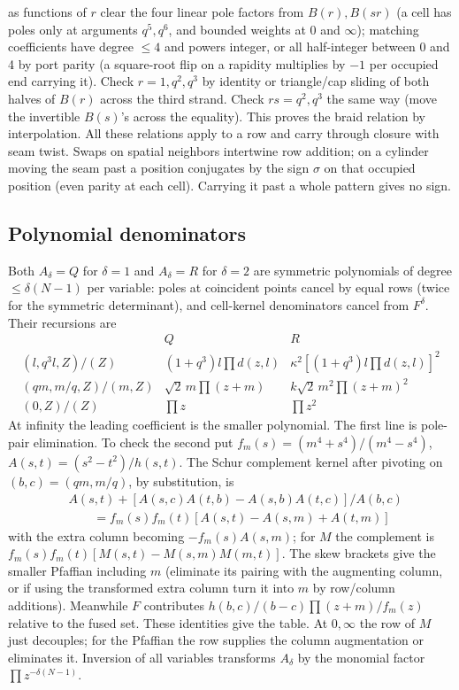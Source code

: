 as functions of \(r\) clear the four linear pole factors from \(B(r),B(sr)\) (a cell has poles only at arguments \(q^5,q^6\), and bounded weights at 0 and \(\infty\)); matching coefficients have degree \(\le4\) and powers integer, or all half-integer between 0 and 4 by port parity (a square-root flip on a rapidity multiplies by \(-1\) per occupied end carrying it). Check \(r=1,q^2,q^3\) by identity or triangle/cap sliding of both halves of \(B(r)\) across the third strand. Check \(rs=q^2,q^3\) the same way (move the invertible \(B(s)\)'s across the equality). This proves the braid relation by interpolation. All these relations apply to a row and carry through closure with seam twist. Swaps on spatial neighbors intertwine row addition; on a cylinder moving the seam past a position conjugates by the sign \(\sigma\) on that occupied position (even parity at each cell). Carrying it past a whole pattern gives no sign.

\subsection{Polynomial denominators}\label{L:step2}

Both \(A_\delta=Q\) for \(\delta=1\) and \(A_\delta=R\) for \(\delta=2\) are symmetric polynomials of degree \(\le\delta(N-1)\) per variable: poles at coincident points cancel by equal rows (twice for the symmetric determinant), and cell-kernel denominators cancel from \(F^\delta\). Their recursions are
\begin{equation}\label{L:eq:polynomial-reductions}
\begin{array}{l|l|l}
 &Q&R\\ \hline
 (l,q^3 l,Z)/ (Z) &(1+q^3)l\prod d(z,l)
 &\kappa^2[(1+q^3)l\prod d(z,l)]^2\\
 (qm,m/q,Z)/(m,Z)&\sqrt2\,m\prod(z+m)&k\sqrt2\,m^2\prod(z+m)^2\\
 (0,Z)/(Z)&\prod z &\prod z^2
\end{array}
\end{equation}
At infinity the leading coefficient is the smaller polynomial. The first line is pole-pair elimination. To check the second put \(f_m(s)=(m^4+s^4)/(m^4-s^4)\), \(A(s,t)=(s^2-t^2)/h(s,t)\). The Schur complement kernel after pivoting on \((b,c)=(q m,m/q)\), by substitution, is
\[
 \begin{aligned}
 &A(s,t)+[A(s,c)A(t,b)-A(s,b)A(t,c)]/A(b,c)\\
 &\qquad=f_m(s)f_m(t)[A(s,t)-A(s,m)+A(t,m)]
 \end{aligned}
\]
with the extra column becoming \(-f_m(s) A(s,m)\); for \(M\) the complement is \(f_m(s) f_m(t)[M(s,t)-M(s,m)M(m,t)]\). The skew brackets give the smaller Pfaffian including \(m\) (eliminate its pairing with the augmenting column, or if using the transformed extra column turn it into \(m\) by row/column additions). Meanwhile \(F\) contributes \(h(b,c)/(b-c)\prod(z+m)/f_m(z)\) relative to the fused set. These identities give the table. At \(0,\infty\) the row of \(M\) just decouples; for the Pfaffian the row supplies the column augmentation or eliminates it. Inversion of all variables transforms \(A_\delta\) by the monomial factor \(\prod z^{-\delta(N-1)}\).

